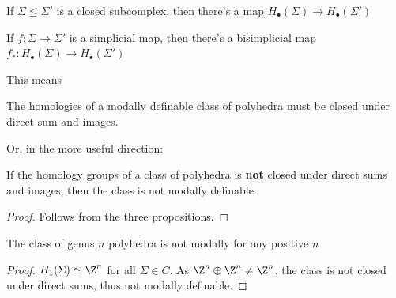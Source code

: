 \begin{proposition}
If $\Sigma\leq\Sigma'$ is a closed subcomplex, then there's a map $H_\bullet(\Sigma)\to H_\bullet(\Sigma')$
\end{proposition}

\begin{proposition}
If $f:\Sigma\to\Sigma'$ is a simplicial map, then there's a bisimplicial map $f_*:H_\bullet(\Sigma)\to H_\bullet(\Sigma')$
\end{proposition}

This means
\begin{lemma}
The homologies of a modally definable class of polyhedra must be closed under direct sum and images.

Or, in the more useful direction:

If the homology groups of a class of polyhedra is \textbf{not} closed under direct sums and images, then the class is not modally definable.
\end{lemma}
\begin{proof}
Follows from the three propositions.
\end{proof}

\begin{corollary}
The class of genus $n$ polyhedra is not modally for any positive $n$ 
\end{corollary}
\begin{proof}
    $H_1(\Sigma)\simeq\Z^n$ for all $\Sigma\in C$. 
    As $\Z^n\oplus \Z^n\neq \Z^n$, the class is not closed under direct sums, thus not modally definable.
\end{proof}